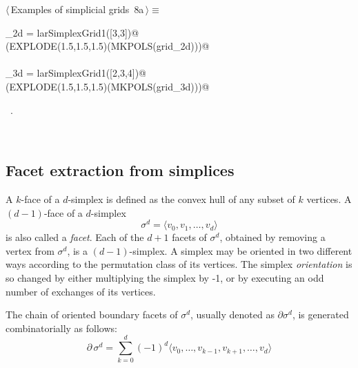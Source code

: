 \documentclass[11pt,oneside]{article}	%
\begin{document}
\begin{flushleft} \small
\begin{minipage}{\linewidth} \label{scrap7}
\protect{}$\langle\,$Examples of simplicial grids\nobreak\ {\footnotesize 8a}$\,\rangle\equiv$
\vspace{-1ex}
\begin{list}{}{} \item
\mbox{}\verb@grid_2d = larSimplexGrid1([3,3])@\\
\mbox{}\verb@VIEW(EXPLODE(1.5,1.5,1.5)(MKPOLS(grid_2d)))@\\
\mbox{}\verb@@\\
\mbox{}\verb@grid_3d = larSimplexGrid1([2,3,4])@\\
\mbox{}\verb@VIEW(EXPLODE(1.5,1.5,1.5)(MKPOLS(grid_3d)))@\\
\mbox{}\verb@@{\NWsep}
\end{list}
\vspace{-1ex}
\footnotesize\addtolength{\baselineskip}{-1ex}
\begin{list}{}{\setlength{\itemsep}{-\parsep}\setlength{\itemindent}{-\leftmargin}}
\item \NWtxtMacroRefIn\ .
\end{list}
\end{minipage}\\[4ex]
\end{flushleft}


\subsection{Facet extraction from simplices}

A $k$-face of a $d$-simplex is defined as the convex hull of any subset of $k$ vertices.
A $(d-1)$-face of a $d$-simplex 
\[
\sigma^d = \langle v_0, v_1, \ldots, v_d \rangle
\]
 is also called a \emph{facet}. Each of the $d+1$ facets of $\sigma^d$, obtained by removing a vertex from $\sigma^d$, is a $(d-1)$-simplex. A simplex may be oriented in two different ways according to the permutation
class of its vertices. The simplex \emph{orientation} is so changed by either multiplying the simplex by -1, or by executing an odd number of exchanges of its vertices. 

The chain of oriented boundary facets of $\sigma^d$, usually denoted as $\partial \sigma^d$, is generated combinatorially as follows:
\[
\partial\, \sigma^d = \sum_{k=0}^d (-1)^d \langle v_0, \ldots, v_{k-1}, v_{k+1}, \ldots, v_d \rangle
\]
\end{document}

